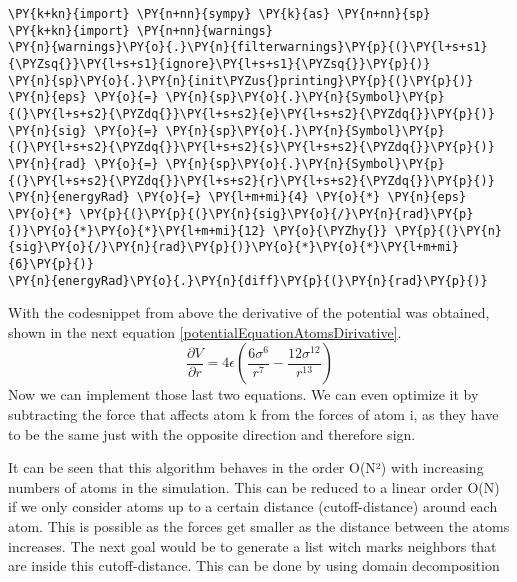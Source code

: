 \begin{tcolorbox}[breakable, size=fbox, boxrule=1pt, pad at break*=1mm,colback=cellbackground, colframe=cellborder]
\begin{Verbatim}[commandchars=\\\{\}]
\PY{k+kn}{import} \PY{n+nn}{sympy} \PY{k}{as} \PY{n+nn}{sp}
\PY{k+kn}{import} \PY{n+nn}{warnings}
\PY{n}{warnings}\PY{o}{.}\PY{n}{filterwarnings}\PY{p}{(}\PY{l+s+s1}{\PYZsq{}}\PY{l+s+s1}{ignore}\PY{l+s+s1}{\PYZsq{}}\PY{p}{)}
\PY{n}{sp}\PY{o}{.}\PY{n}{init\PYZus{}printing}\PY{p}{(}\PY{p}{)}
\PY{n}{eps} \PY{o}{=} \PY{n}{sp}\PY{o}{.}\PY{n}{Symbol}\PY{p}{(}\PY{l+s+s2}{\PYZdq{}}\PY{l+s+s2}{e}\PY{l+s+s2}{\PYZdq{}}\PY{p}{)}
\PY{n}{sig} \PY{o}{=} \PY{n}{sp}\PY{o}{.}\PY{n}{Symbol}\PY{p}{(}\PY{l+s+s2}{\PYZdq{}}\PY{l+s+s2}{s}\PY{l+s+s2}{\PYZdq{}}\PY{p}{)}
\PY{n}{rad} \PY{o}{=} \PY{n}{sp}\PY{o}{.}\PY{n}{Symbol}\PY{p}{(}\PY{l+s+s2}{\PYZdq{}}\PY{l+s+s2}{r}\PY{l+s+s2}{\PYZdq{}}\PY{p}{)}
\PY{n}{energyRad} \PY{o}{=} \PY{l+m+mi}{4} \PY{o}{*} \PY{n}{eps} \PY{o}{*} \PY{p}{(}\PY{p}{(}\PY{n}{sig}\PY{o}{/}\PY{n}{rad}\PY{p}{)}\PY{o}{*}\PY{o}{*}\PY{l+m+mi}{12} \PY{o}{\PYZhy{}} \PY{p}{(}\PY{n}{sig}\PY{o}{/}\PY{n}{rad}\PY{p}{)}\PY{o}{*}\PY{o}{*}\PY{l+m+mi}{6}\PY{p}{)}
\PY{n}{energyRad}\PY{o}{.}\PY{n}{diff}\PY{p}{(}\PY{n}{rad}\PY{p}{)}
	\end{Verbatim}
\end{tcolorbox}

With the codesnippet from above the derivative of the potential was obtained, shown in the next equation \ref{potentialEquationAtomsDirivative}.
\begin{equation}
	\label{potentialEquationAtomsDirivative}
	\frac{\partial V}{\partial r} = 4 \epsilon \left(\frac{6 \sigma^{6}}{r^{7}} - \frac{12 \sigma^{12}}{r^{13}}\right)
\end{equation}
Now we can implement those last two equations. We can even optimize it by subtracting the force that affects atom k from the forces of atom i, as they have to be the same just with the opposite direction and therefore sign. 
\par 
It can be seen that this algorithm behaves in the order O(N²) with increasing numbers of atoms in the simulation. This can be reduced to a linear order O(N) if we only consider atoms up to a certain distance (cutoff-distance) around each atom. This is possible as the forces get smaller as the distance between the atoms increases. The next goal would be to generate a list witch marks neighbors that are inside this cutoff-distance. This can be done by using domain decomposition \cite[cf.][]{molDymCourse}
